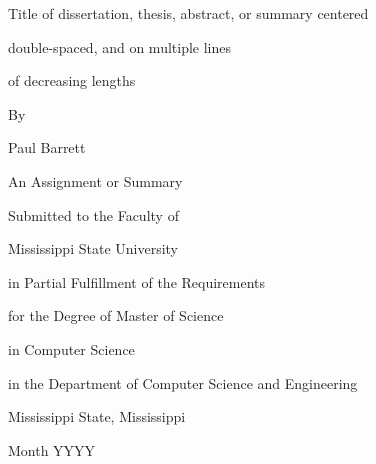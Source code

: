 \documentclass[12pt]{report}
\begin{document}
\begin{titlepage}


    \centering
    \null
    \vfill
    

    Title  of dissertation, thesis, abstract, or summary centered
    
    \bigskip
    
    double-spaced, and on multiple lines
    
    \bigskip
    
    of decreasing lengths
    
    \vspace{1in}
    
    By
    
    \bigskip
    
    Paul Barrett
    
    \vspace{1.5in}
    
    An Assignment or Summary
    
    Submitted to the Faculty of
    
    Mississippi State University
    
    in Partial Fulfillment of the Requirements
    
    for the Degree of Master of Science
    
    in Computer Science
    
    in the Department of Computer Science and Engineering
    \bigskip
    \bigskip
    
    Mississippi State, Mississippi
    
    \bigskip
    
    Month YYYY
    
\end{titlepage}
\end{document}
